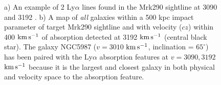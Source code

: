 \documentclass[twocolumn,tighten]{aastex6}
\providecommand{\DIFaddbeginFL}{} %
\providecommand{\DIFaddendFL}{} %
\providecommand{\DIFdelbeginFL}{} %
\providecommand{\DIFdelendFL}{} %
\begin{document}
\begin{figure}[t!]
  \caption{\DIFdelbeginFL %
\DIFdelendFL \DIFaddbeginFL \small{a) An example of 2 Ly$\alpha$ lines found in the Mrk290 sightline at 3090 and 3192 . b) A map of \textit{all} galaxies within a 500 kpc impact parameter of target Mrk290 sightline and with velocity ($cz$) within 400 $\rm km\, s^{-1}$ of absorption detected at 3192 $\rm km\, s^{-1}$ (central black star). The galaxy NGC5987 ($v=3010$ $\rm km\, s^{-1}$, inclination = $65^{\circ}$) has been paired with the Ly$\alpha$ absorption features at $v=3090, 3192$ $\rm km\, s^{-1}$ because it is the largest and closest galaxy in both physical and velocity space to the absorption feature.}\DIFaddendFL }
\vspace{5pt}
\end{figure}
\end{document}
